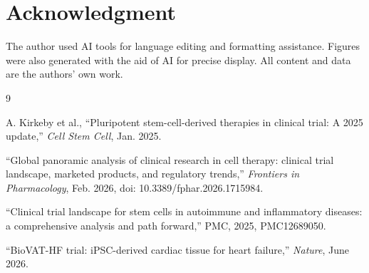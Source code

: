 \documentclass[11pt]{article}
\begin{document}
\section*{Acknowledgment}

\noindent The author used AI tools for language editing and
formatting assistance. Figures were also generated with the aid of AI for precise display. All content and data
are the authors' own work.

\vspace{4pt} %

% 

\begin{thebibliography}{9}

A. Kirkeby et al., ``Pluripotent stem-cell-derived therapies in clinical trial: A 2025 update,'' \textit{Cell Stem Cell}, Jan. 2025.

``Global panoramic analysis of clinical research in cell therapy: clinical trial landscape, marketed products, and regulatory trends,'' \textit{Frontiers in Pharmacology}, Feb. 2026, doi: 10.3389/fphar.2026.1715984.

``Clinical trial landscape for stem cells in autoimmune and inflammatory diseases: a comprehensive analysis and path forward,'' PMC, 2025, PMC12689050.

``BioVAT-HF trial: iPSC-derived cardiac tissue for heart failure,'' \textit{Nature}, June 2026.

\end{thebibliography}
\end{document}
